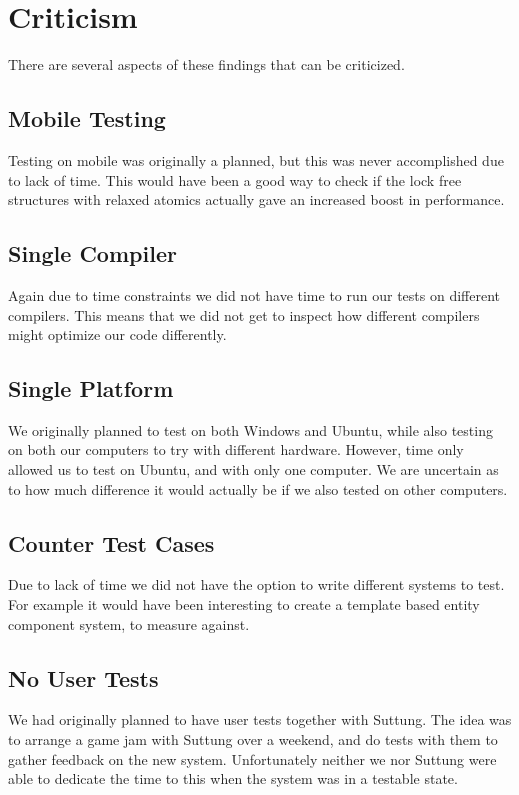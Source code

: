 \section{Criticism}
There are several aspects of these findings that can be criticized.

\subsection{Mobile Testing}
Testing on mobile was originally a planned, but this was never accomplished due to lack of time.
This would have been a good way to check if the lock free structures with relaxed atomics actually
gave an increased boost in performance.

\subsection{Single Compiler}
Again due to time constraints we did not have time to run our tests on different compilers.
This means that we did not get to inspect how different compilers might optimize our code differently.

\subsection{Single Platform}
We originally planned to test on both Windows and Ubuntu, while also testing on both our computers to
try with different hardware. However, time only allowed us to test on Ubuntu, and with only one computer.
We are uncertain as to how much difference it would actually be if we also tested on other computers.

\subsection{Counter Test Cases}
Due to lack of time we did not have the option to write different systems to test.
For example it would have been interesting to create a template based entity component system,
to measure against.

\subsection{No User Tests}
We had originally planned to have user tests together with Suttung.
The idea was to arrange a game jam with Suttung over a weekend,
and do tests with them to gather feedback on the new system.
Unfortunately neither we nor Suttung were able to dedicate the time to this when the system
was in a testable state.
